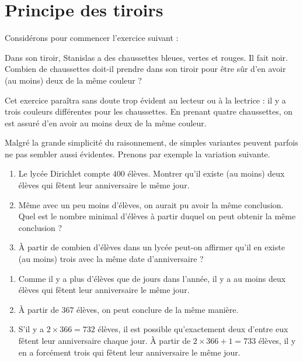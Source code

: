 
\chapter{Principe des tiroirs}


Considérons pour commencer l'exercice suivant :

\begin{exo}
Dans son tiroir, Stanislas a des chaussettes bleues, vertes et rouges. Il fait noir. \\
Combien de chaussettes doit-il prendre dans son tiroir pour être sûr d'en avoir (au moins) deux de la même couleur ?
\end{exo}

\vspace{1em}
Cet exercice paraîtra sans doute trop évident au lecteur ou à la lectrice : il y a trois couleurs différentes pour les chaussettes. En prenant quatre chaussettes, on est assuré d'en avoir au moins deux de la même couleur.

Malgré la grande simplicité du raisonnement, de simples variantes peuvent parfois ne pas sembler aussi évidentes. Prenons par exemple la variation suivante.

\begin{exo}[Anniversaires]
\begin{enumerate}
\item
Le lycée Dirichlet compte $400$ élèves. Montrer qu'il existe (au moins) deux élèves qui fêtent leur anniversaire le même jour.

\item Même avec un peu moins d'élèves, on aurait pu avoir la même conclusion. Quel est le nombre minimal d'élèves à partir duquel on peut obtenir la même conclusion ?

\item À partir de combien d'élèves dans un lycée peut-on affirmer qu'il en existe  (au moins) trois avec la même date d'anniversaire ?
\end{enumerate}
\begin{sol}
\begin{enumerate}
\item
Comme il y a plus d'élèves que de jours dans l'année, il y a au moins deux élèves qui fêtent leur anniversaire le même jour.

\item À partir de $367$ élèves, on peut conclure de la même manière.

\item S'il y a $2\times 366=732$ élèves, il est possible qu'exactement deux d'entre eux fêtent leur anniversaire chaque jour. À partir de $2\times 366+1=733$ élèves, il y en a forcément trois qui fêtent leur anniversaire le même jour.
\end{enumerate}
\end{sol}
\end{exo}

